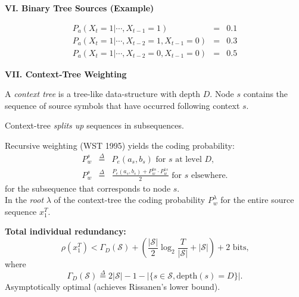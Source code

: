 \documentclass[a4paper,landscape]{slides} %
\newcommand{\cS}{{\mathcal{S}}}
\newcommand{\define}{\stackrel{\Delta}{=}}
\newcommand{\xT}{x_{1}^{T}}
\newcommand{\GD}{{\Gamma_{D}}}
\begin{document}
\begin{slide}{\bf\Large\color{blue} VI. Binary Tree Sources (Example)}
\begin{center}

\end{center}
\begin{eqnarray*}
P_{a}(X_{t}=1|\cdots,X_{t-1}=1)           &=& 0.1 \\
P_{a}(X_{t}=1|\cdots,X_{t-2}=1,X_{t-1}=0) &=& 0.3 \\
P_{a}(X_{t}=1|\cdots,X_{t-2}=0,X_{t-1}=0) &=& 0.5
\end{eqnarray*}
\end{slide}
\begin{slide}{\bf\Large\color{blue} VII. Context-Tree Weighting}

A {\em context tree} is a tree-like data-structure with depth $D$.
Node $s$ contains the
sequence of source symbols that have occurred following context
$s$.
\begin{center}

\end{center}
\end{slide}
\begin{slide}
Context-tree {\em splits up} sequences in subsequences.
\begin{center}

\end{center}
\end{slide}
\begin{slide}
Recursive weighting (WST 1995) yields the coding probability:
\begin{eqnarray*}
P_w^s &\define& P_e(a_s,b_s) \text{ for $s$ at level $D$,} \\
P_{w}^{s} &\define& \frac{P_{e}(a_{s},b_{s}) + P_{w}^{0s}\cdot P_{w}^{1s}}{2} \text{ for $s$ elsewhere.}
\end{eqnarray*}
for the subsequence that corresponds to node $s$. \\
In the {\em root} $\lambda$ of the context-tree the coding probability $P_{w}^{\lambda}$ for the entire source sequence
$\xT$.

{\bf Total individual redundancy:}
\[
\rho(\xT) <
\GD(\mathcal{S}) + \left( \frac{|\cS|}{2}\log_{2}\frac{T}{|\cS|} + |\cS| \right)
+ 2\text{ bits,}
\]
where
\begin{equation*}
\GD(\cS) \define 2|\cS| - 1 - |\{ s\in\cS, \mbox{depth$(s) = D$} \}|. %
\end{equation*}
Asymptotically optimal (achieves Rissanen's lower bound).
\end{slide}
\end{document}

